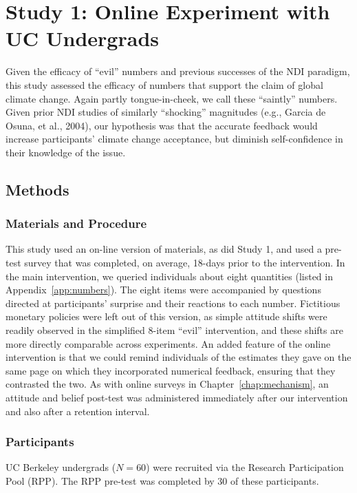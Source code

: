 \section{Study 1: Online Experiment with UC Undergrads}
\label{sec:pro-uc}

Given the efficacy of “evil” numbers and previous successes of the NDI paradigm,
this study assessed the efficacy of numbers that support the claim of global
climate change. Again partly tongue-in-cheek, we call these “saintly” numbers.
Given prior NDI studies of similarly “shocking” magnitudes (e.g., Garcia de
Osuna, et al., 2004), our hypothesis was that the accurate feedback would
increase participants’ climate change acceptance, but diminish self-confidence
in their knowledge of the issue.


\subsection{Methods}

\subsubsection{Materials and Procedure}

This study used an on-line version of materials, as did Study 1, and used a
pre-test survey that was completed, on average, 18-days prior to the
intervention. In the main intervention, we queried individuals about eight
quantities (listed in Appendix~\ref{app:numbers}). The eight items were
accompanied by questions directed at participants’ surprise and their reactions
to each number. Fictitious monetary policies were left out of this version, as
simple attitude shifts were readily observed in the simplified 8-item “evil”
intervention, and these shifts are more directly comparable across experiments.
An added feature of the online intervention is that we could remind individuals
of the estimates they gave on the same page on which they incorporated numerical
feedback, ensuring that they contrasted the two. As with online surveys in
Chapter~\ref{chap:mechanism}, an attitude and belief post-test was administered
immediately after our intervention and also after a retention interval.

\subsubsection{Participants}

UC Berkeley undergrads ($N=60$) were recruited via the Research Participation
Pool (RPP). The RPP pre-test was completed by 30 of these participants. 

